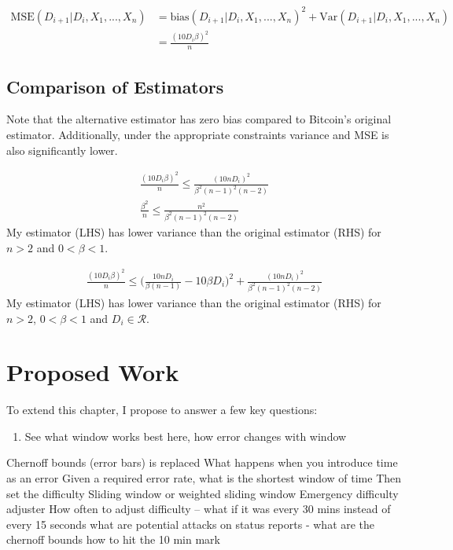 \begin{align}
\text{MSE}(D_{i+1}|D_i,X_1,...,X_n) &= \text{bias}(D_{i+1}|D_i,X_1,...,X_n)^2 + \text{Var}(D_{i+1}|D_i,X_1,...,X_n) \\
&= \frac{(10 D_i\beta)^2}{n}
\end{align}

\subsection{Comparison of Estimators}
Note that the alternative estimator has zero bias compared to Bitcoin's original estimator. Additionally, under the appropriate constraints variance and MSE is also significantly lower.
\par \noindent {}
\begin{align}
\frac{(10 D_i\beta)^2}{n} \leq \frac{(10n D_i)^2}{\beta^2(n-1)^2(n-2)} \\
\frac{\beta^2}{n} \leq \frac{n^2}{\beta^2(n-1)^2(n-2)} 
\end{align}
My estimator (LHS) has lower variance than the original estimator (RHS) for $n>2$ and $0<\beta<1$.

\begin{align}
\frac{(10 D_i\beta)^2}{n} \leq \Bigg(\frac{10n D_i}{\beta(n-1)} - 10\beta D_i\Bigg)^2 + \frac{(10n D_i)^2}{\beta^2(n-1)^2(n-2)}
\end{align}
My estimator (LHS) has lower variance than the original estimator (RHS) for $n>2$, $0<\beta<1$ and $D_i \in \mathcal{R}$. 

\section{Proposed Work}
To extend this chapter, I propose to answer a few key questions:
\begin{enumerate}
\item See what window works best here, how error changes with window
\end{enumerate}

Chernoff bounds (error bars) is replaced
What happens when you introduce time as an error
Given a required error rate, what is the shortest window of time
Then set the difficulty
Sliding window or weighted sliding window
Emergency difficulty adjuster
How often to adjust difficulty -- what if it was every 30 mins instead of every 15 seconds 
what are potential attacks on status reports - what are the chernoff bounds
how to hit the 10 min mark


